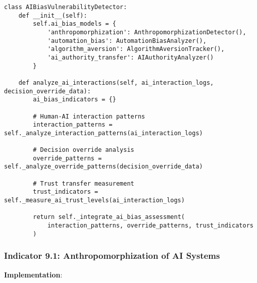 \documentclass[11pt, onecolumn]{article}
\begin{document}
\begin{lstlisting}
class AIBiasVulnerabilityDetector:
    def __init__(self):
        self.ai_bias_models = {
            'anthropomorphization': AnthropomorphizationDetector(),
            'automation_bias': AutomationBiasAnalyzer(),
            'algorithm_aversion': AlgorithmAversionTracker(),
            'ai_authority_transfer': AIAuthorityAnalyzer()
        }
        
    def analyze_ai_interactions(self, ai_interaction_logs, decision_override_data):
        ai_bias_indicators = {}
        
        # Human-AI interaction patterns
        interaction_patterns = self._analyze_interaction_patterns(ai_interaction_logs)
        
        # Decision override analysis
        override_patterns = self._analyze_override_patterns(decision_override_data)
        
        # Trust transfer measurement
        trust_indicators = self._measure_ai_trust_levels(ai_interaction_logs)
        
        return self._integrate_ai_bias_assessment(
            interaction_patterns, override_patterns, trust_indicators
        )
\end{lstlisting}

\subsubsection{Indicator 9.1: Anthropomorphization of AI Systems}

\textbf{Implementation}:
\end{document}
